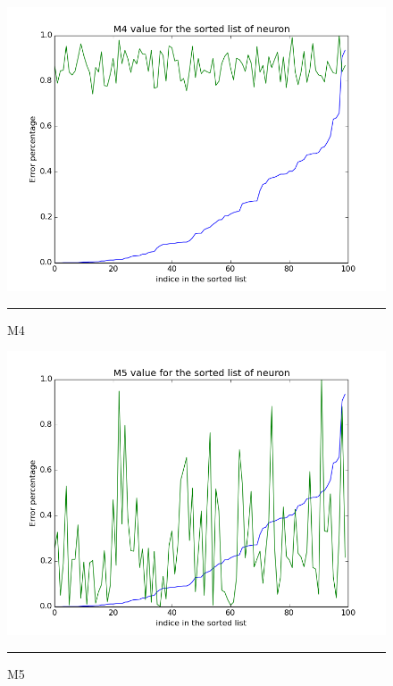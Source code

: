 \begin{figure}[htbp]
    \centering
    \includegraphics[scale=0.5]{Figures/m4.png}
    \rule{35em}{0.5pt}
    \caption[M4]{M4}
    \label{fig:m4}
\end{figure}


\begin{figure}[htbp]
    \centering
    \includegraphics[scale=0.5]{Figures/m5.png}
    \rule{35em}{0.5pt}
    \caption[M5]{M5}
    \label{fig:m5}
\end{figure}


